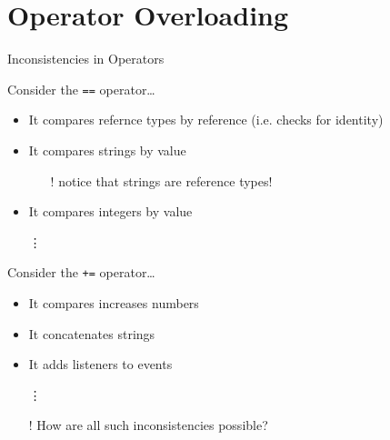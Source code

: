 \documentclass[presentation]{beamer}
\begin{document}
\section{Operator Overloading}

\begin{frame}{Inconsistencies in \csharp Operators}
  \begin{block}{Consider the \texttt{==} operator\ldots}
    \begin{itemize}
      \item It compares refernce types by reference (i.e. checks for identity)
      \item It compares strings by value
      \begin{itemize}
        \item[!] notice that strings are reference types!
      \end{itemize}
      \item It compares integers by value
      \item[\vdots] 
    \end{itemize}
  \end{block}

  \begin{block}{Consider the \texttt{+=} operator\ldots}
    \begin{itemize}
      \item It compares increases numbers
      \item It concatenates strings
      \item It adds listeners to events
      \item[\vdots] 
    \end{itemize}
  \end{block}

  \begin{itemize}
    \item[!] How are all such inconsistencies possible?
  \end{itemize}
\end{frame}
\end{document}
